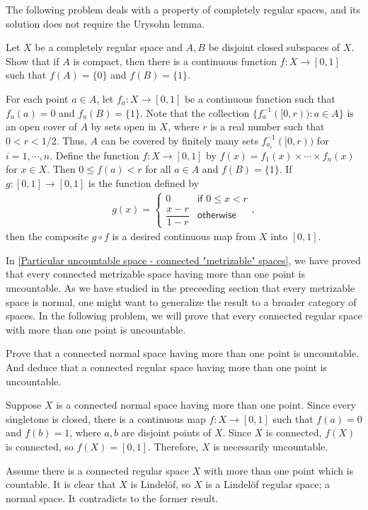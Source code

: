 The following problem deals with a property of completely regular spaces, and its solution does not require the Urysohn lemma.
\begin{prob}
    Let $X$ be a completely regular space and $A, B$ be disjoint closed subspaces of $X$.
    Show that if $A$ is compact, then there is a continuous function $f: X\rightarrow[0, 1]$ such that $f(A)=\{0\}$ and $f(B)=\{1\}$.
\end{prob}
\begin{sol}
    For each point $a\in A$, let $f_a: X\rightarrow[0, 1]$ be a continuous function such that $f_a(a)=0$ and $f_a(B)=\{1\}$.
    Note that the collection $\{f_a^{-1}([0, r)):a\in A\}$ is an open cover of $A$ by sets open in $X$, where $r$ is a real number such that $0<r<1/2$.
    Thus, $A$ can be covered by finitely many sets $f_{a_i}^{-1}([0, r))$ for $i=1, \cdots, n$.
    Define the function $f: X\rightarrow[0, 1]$ by $f(x)=f_1(x)\times\cdots\times f_n(x)$ for $x\in X$.
    Then $0\leq f(a)<r$ for all $a\in A$ and $f(B)=\{1\}$.
    If $g:[0, 1]\rightarrow[0, 1]$ is the function defined by
    \begin{eqnarray*}
        g(x)=\left\{
        \begin{matrix}
            0 & \textsf{if }0\leq x<r\\
            \dfrac{x-r}{1-r} & \textsf{otherwise}
        \end{matrix}\right.,
    \end{eqnarray*}
    then the composite $g\circ f$ is a desired continuous map from $X$ into $[0, 1]$.
\end{sol}

In \cref{Particular uncountable space - connected "metrizable" spaces}, we have proved that every connected metrizable space having more than one point is uncountable.
As we have studied in the preceeding section that every metrizable space is normal, one might want to generalize the result to a broader category of spaces.
In the following problem, we will prove that every connected regular space with more than one point is uncountable.
\begin{prob}\label{nontrivial connected regular spaces are uncountable}
    Prove that a connected normal space having more than one point is uncountable.
    And deduce that a connected regular space having more than one point is uncountable.
\end{prob}
\begin{sol}
    Suppose $X$ is a connected normal space having more than one point.
    Since every singletone is closed, there is a continuous map $f: X\rightarrow[0, 1]$ such that $f(a)=0$ and $f(b)=1$, where $a, b$ are disjoint points of $X$.
    Since $X$ is connected, $f(X)$ is connected, so $f(X)=[0, 1]$.
    Therefore, $X$ is necessarily uncountable.
            
    Assume there is a connected regular space $X$ with more than one point which is countable.
    It is clear that $X$ is Lindel\"{o}f, so $X$ is a Lindel\"{o}f regular space; a normal space.
    It contradicts to the former result.
\end{sol}